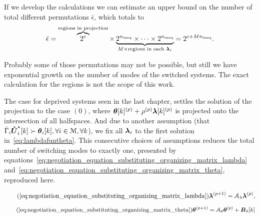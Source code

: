 \documentclass[../main.tex]{subfiles}
\begin{document}
If we develop the calculations we can estimate an upper bound on the number of total different permutations $\bar{\epsilon}$, which totals to
\begin{equation}
  \label{eq:1}
  \bar{\epsilon}=\overbrace{2^{c}}^{\text{regions in projection}}\times \underbrace{2^{n_{\text{ineq}}}\times \dots \times 2^{{n_{\text{ineq}}}}}_{M\times \text{regions in each }\boldsymbol{\lambda}_{i} }=2^{c+Mn_{\text{ineq}}}.
\end{equation}

\begin{remark}
  Probably some of those permutations may not be possible, but still we have exponential growth on the number of modes of the switched systems.
  The exact calculation for the regions is not the scope of this work.
\end{remark}

The case for deprived systems seen in the last chapter, settles the solution of the projection to the case $(0)$, where $\boldsymbol{\theta}[k]^{(p)}+\rho^{(p)}\boldsymbol{\lambda}[k]^{(p)}$ is projected onto the intersection of all halfspaces.
And due to another assumption (that $\bar{\Gamma}_{i}\optuncUik\succ \thetaik, \forall i\in\set{M}, \forall k$), we fix all $\boldsymbol{\lambda}_{i}$ to the first solution in~\eqref{eq:lambdafuntheta}.
This consecutive choices of assumptions reduces the total number of switching modes to exactly one, presented by equations~\eqref{eq:negotiation_equation_substituting_organizing_matrix_lambda} and~\eqref{eq:negotiation_equation_substituting_organizing_matrix_theta}, reproduced here.

\begin{equation}
  \label{eq:negotiation_equation_substituting_organizing_matrix_lambda_reprise}
  \tag{\ref*{eq:negotiation_equation_substituting_organizing_matrix_lambda}}
  \vec{\lambda}\pplusone=\mathcal{A}_{\lambda}\vec{\lambda}\p,
\end{equation}
\begin{equation}
  \label{eq:negotiation_equation_substituting_organizing_matrix_theta_reprise}
  \tag{\ref*{eq:negotiation_equation_substituting_organizing_matrix_theta}}
  \vec{\theta}\pplusone=\mathcal{A}_{\theta}\vec{\theta}\p+\mathcal{\vec{B}}_{\theta}[k]
\end{equation}
\end{document}
